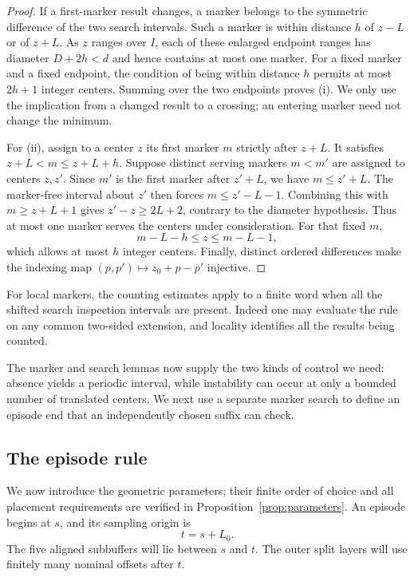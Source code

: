 \begin{proof}
If a first-marker result changes, a marker belongs to the symmetric
difference of the two search intervals.  Such a marker is within distance
$h$ of $z-L$ or of $z+L$.  As $z$ ranges over $I$, each of these enlarged
endpoint ranges has diameter $D+2h<d$ and hence contains at most one
marker.  For a fixed marker and a fixed endpoint, the condition of being
within distance $h$ permits at most $2h+1$ integer centers.  Summing over
the two endpoints proves (i).  We only use the implication from a changed
result to a crossing; an entering marker need not change the minimum.

For (ii), assign to a center $z$ its first marker $m$ strictly after
$z+L$.  It satisfies $z+L<m\le z+L+h$.  Suppose distinct serving markers
$m<m'$ are assigned to centers $z,z'$.  Since $m'$ is the first marker
after $z'+L$, we have $m\le z'+L$.  The marker-free interval about $z'$
then forces $m\le z'-L-1$.  Combining this with $m\ge z+L+1$ gives
$z'-z\ge2L+2$, contrary to the diameter hypothesis.  Thus at most one
marker serves the centers under consideration.  For that fixed $m$,
\[
 m-L-h\le z\le m-L-1,
\]
which allows at most $h$ integer centers.  Finally, distinct ordered
differences make the indexing map $(p,p')\mapsto z_0+p-p'$ injective.
\end{proof}

For local markers, the counting estimates apply to a finite word when
all the shifted search inspection intervals are present.  Indeed one
may evaluate the rule on any common two-sided extension, and locality
identifies all the results being counted.

The marker and search lemmas now supply the two kinds of control we need:
absence yields a periodic interval, while instability can occur at only a
bounded number of translated centers. We next use a separate marker search
to define an episode end that an independently chosen suffix can check.

\subsection{The episode rule}

We now introduce the geometric parameters; their finite order of choice
and all placement requirements are verified in
Proposition~\ref{prop:parameters}.  An episode begins at $s$, and its
sampling origin is
\[
 t=s+L_0.
\]
The five aligned subbuffers will lie between $s$ and $t$.  The outer
split layers will use finitely many nominal offsets after $t$.

